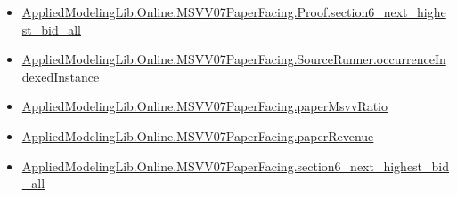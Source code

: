 \documentclass[10pt]{article}
\begin{document}
\begin{itemize}
\item \hyperlink{governing-declaration-d18c398f33d1fc45}{Applied\allowbreak{}Modeling\allowbreak{}Lib.\allowbreak{}Online.\allowbreak{}MSVV07\allowbreak{}Paper\allowbreak{}Facing.\allowbreak{}Proof.\allowbreak{}section6\_\allowbreak{}next\_\allowbreak{}highest\_\allowbreak{}bid\_\allowbreak{}all}
\item \hyperlink{governing-declaration-15d177ff0033a703}{Applied\allowbreak{}Modeling\allowbreak{}Lib.\allowbreak{}Online.\allowbreak{}MSVV07\allowbreak{}Paper\allowbreak{}Facing.\allowbreak{}Source\allowbreak{}Runner.\allowbreak{}occurrence\allowbreak{}Indexed\allowbreak{}Instance}
\item \hyperlink{governing-declaration-11865634591d1a39}{Applied\allowbreak{}Modeling\allowbreak{}Lib.\allowbreak{}Online.\allowbreak{}MSVV07\allowbreak{}Paper\allowbreak{}Facing.\allowbreak{}paper\allowbreak{}Msvv\allowbreak{}Ratio}
\item \hyperlink{governing-declaration-3d5795d9eda3f090}{Applied\allowbreak{}Modeling\allowbreak{}Lib.\allowbreak{}Online.\allowbreak{}MSVV07\allowbreak{}Paper\allowbreak{}Facing.\allowbreak{}paper\allowbreak{}Revenue}
\item \hyperlink{governing-declaration-5cea0eb3c7a14423}{Applied\allowbreak{}Modeling\allowbreak{}Lib.\allowbreak{}Online.\allowbreak{}MSVV07\allowbreak{}Paper\allowbreak{}Facing.\allowbreak{}section6\_\allowbreak{}next\_\allowbreak{}highest\_\allowbreak{}bid\_\allowbreak{}all}
\end{itemize}
\end{document}
